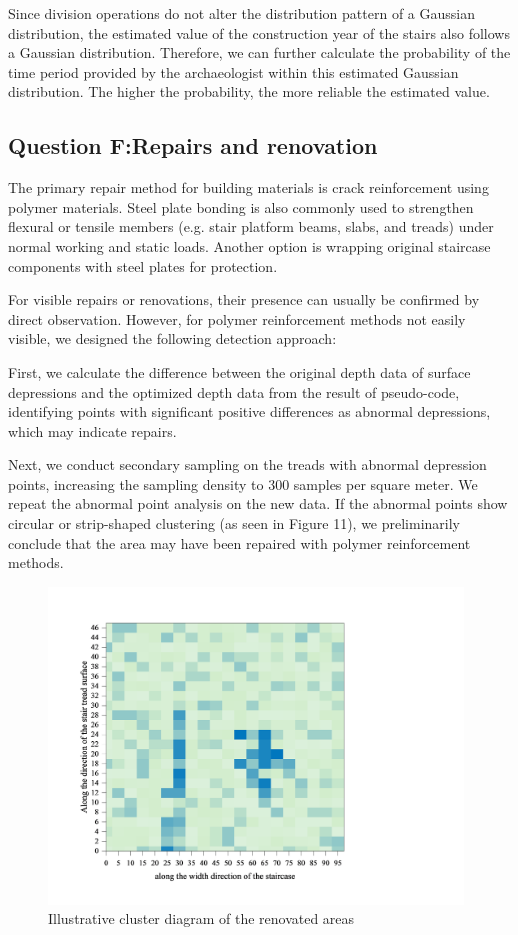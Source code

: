 \documentclass{mcmthesis}
\begin{document}
Since division operations do not alter the distribution pattern of a Gaussian distribution, the estimated value of the construction year of the stairs also follows a Gaussian distribution. Therefore, we can further calculate the probability of the time period provided by the archaeologist within this estimated Gaussian distribution. The higher the probability, the more reliable the estimated value.

\subsection{Question F:Repairs and renovation}

The primary repair method for building materials is crack reinforcement using polymer materials\cite{YTLX200401034}. Steel plate bonding is also commonly used to strengthen flexural or tensile members (e.g. stair platform beams, slabs, and treads) under normal working and static loads. Another option is wrapping original staircase components with steel plates for protection.

For visible repairs or renovations, their presence can usually be confirmed by direct observation. However, for polymer reinforcement methods not easily visible, we designed the following detection approach:

First, we calculate the difference between the original depth data of surface depressions and the optimized depth data from the result of pseudo-code, identifying points with significant positive differences as abnormal depressions, which may indicate repairs.

Next, we conduct secondary sampling on the treads with abnormal depression points, increasing the sampling density to 300 samples per square meter. We repeat the abnormal point analysis on the new data. If the abnormal points show circular or strip-shaped clustering (as seen in Figure 11), we preliminarily conclude that the area may have been repaired with polymer reinforcement methods.
\begin{figure}[h]  %
  \small
  \centering  %
  \includegraphics[width=11cm]{13-Illustrative cluster diagram of the renovated areas.png}
  \caption{Illustrative cluster diagram of the renovated areas} \label{fig:2}  %
  \end{figure}  %
\end{document}

